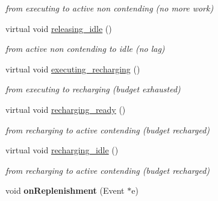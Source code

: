 \begin{DoxyCompactItemize}
\begin{DoxyCompactList}\small\item\em from executing to active non contending (no more work) \end{DoxyCompactList}\item 
virtual void \hyperlink{classRTSim_1_1CBServer_aa570da03f1491eaef1dca281f2df9613}{releasing\+\_\+idle} ()\hypertarget{classRTSim_1_1CBServer_aa570da03f1491eaef1dca281f2df9613}{}\label{classRTSim_1_1CBServer_aa570da03f1491eaef1dca281f2df9613}

\begin{DoxyCompactList}\small\item\em from active non contending to idle (no lag) \end{DoxyCompactList}\item 
virtual void \hyperlink{classRTSim_1_1CBServer_a0fc2a46c8fd58286f746550b6d7be54e}{executing\+\_\+recharging} ()\hypertarget{classRTSim_1_1CBServer_a0fc2a46c8fd58286f746550b6d7be54e}{}\label{classRTSim_1_1CBServer_a0fc2a46c8fd58286f746550b6d7be54e}

\begin{DoxyCompactList}\small\item\em from executing to recharging (budget exhausted) \end{DoxyCompactList}\item 
virtual void \hyperlink{classRTSim_1_1CBServer_ad57d1bbe8a7b5199576bf1fbc7c36302}{recharging\+\_\+ready} ()\hypertarget{classRTSim_1_1CBServer_ad57d1bbe8a7b5199576bf1fbc7c36302}{}\label{classRTSim_1_1CBServer_ad57d1bbe8a7b5199576bf1fbc7c36302}

\begin{DoxyCompactList}\small\item\em from recharging to active contending (budget recharged) \end{DoxyCompactList}\item 
virtual void \hyperlink{classRTSim_1_1CBServer_ab1eb9431017f98cfa1d27ff3d71d4f69}{recharging\+\_\+idle} ()\hypertarget{classRTSim_1_1CBServer_ab1eb9431017f98cfa1d27ff3d71d4f69}{}\label{classRTSim_1_1CBServer_ab1eb9431017f98cfa1d27ff3d71d4f69}

\begin{DoxyCompactList}\small\item\em from recharging to active contending (budget recharged) \end{DoxyCompactList}\item 
void {\bfseries on\+Replenishment} (Event $\ast$e)\hypertarget{classRTSim_1_1CBServer_a3fea4ee610c1dec6f9ed75978ea246da}{}\label{classRTSim_1_1CBServer_a3fea4ee610c1dec6f9ed75978ea246da}


\end{DoxyCompactItemize}
